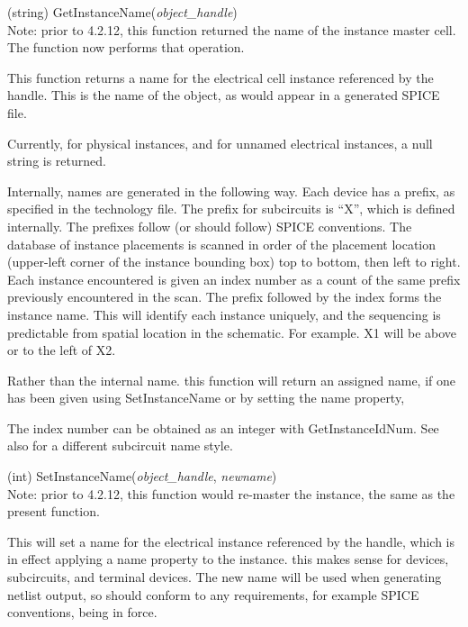 \begin{description}
\item{(string) \vt GetInstanceName({\it object\_handle\/})}\\
Note:  prior to 4.2.12, this function returned the name of the
instance master cell.  The  function now
performs that operation.

This function returns a name for the electrical cell instance
referenced by the handle.  This is the name of the object, as would
appear in a generated SPICE file.

Currently, for physical instances, and for unnamed electrical
instances, a null string is returned.

Internally, names are generated in the following way.  Each device has
a prefix, as specified in the technology file.  The prefix for
subcircuits is ``X'', which is defined internally.  The prefixes
follow (or should follow) SPICE conventions.  The database of instance
placements is scanned in order of the placement location (upper-left
corner of the instance bounding box) top to bottom, then left to
right.  Each instance encountered is given an index number as a count
of the same prefix previously encountered in the scan.  The prefix
followed by the index forms the instance name.  This will identify
each instance uniquely, and the sequencing is predictable from spatial
location in the schematic.  For example.  {\vt X1} will be above or
to the left of {\vt X2}.

Rather than the internal name.  this function will return an assigned
name, if one has been given using {\vt SetInstanceName} or by setting
the name property,

The index number can be obtained as an integer with {\vt
GetInstanceIdNum}.  See also  for a
different subcircuit name style.

\item{(int) \vt SetInstanceName({\it object\_handle\/}, {\it newname\/})}\\
Note:  prior to 4.2.12, this function would re-master the instance,
the same as the present  function.

This will set a name for the electrical instance referenced by the
handle, which is in effect applying a name property to the instance. 
this makes sense for devices, subcircuits, and terminal devices.  The
new name will be used when generating netlist output, so should
conform to any requirements, for example SPICE conventions, being in
force.


\end{description}
